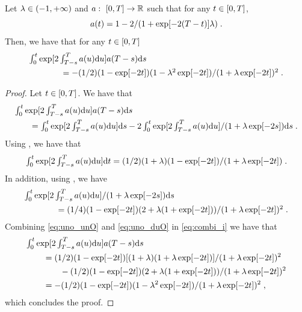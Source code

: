   \begin{lemma}
    \label{lemma:hola_pas_carre}
  Let $\lambda \in \left(-1, +\infty\right)$ and $a: \ \left[0,T\right] \to \mathbb{R}$ such
  that for any $t \in \left[0,T\right]$,
  \begin{equation}
    a(t) = 1 - 2/(1 + \exp[-2(T-t)]\lambda) \; . 
  \end{equation}
  Then, we have that for any $t \in \left[0,T\right]$
  \begin{align}
    &\textstyle{
      \int_0^t \exp[ 2\int_{T-s}^T a(u) \mathrm{d}u] a(T-s) \mathrm{d}s} \\
    & \qquad \qquad \textstyle{= -(1/2)(1- \exp[-2t])(1 - \lambda^2 \exp[-2t])/(1 + \lambda \exp[-2t])^2 \;. 
      }
  \end{align}
\end{lemma}

\begin{proof}
  Let $t \in \left[0,T\right]$. We have that
  \begin{align}
    &\textstyle{\int_0^t \exp[ 2\int_{T-s}^T a(u) \mathrm{d}u] a(T-s) \mathrm{d}s} \\
    & \qquad \textstyle{= \int_0^t \exp[ 2\int_{T-s}^T a(u) \mathrm{d}u] \mathrm{d}s - 2 \int_0^t  \exp[ 2\int_{T-s}^T a(u) \mathrm{d}u] / (1 + \lambda \exp[-2s]) \mathrm{d}s } \; . \label{eq:combi_i}
  \end{align}
  Using , we have that
  \begin{equation}
    \textstyle{
      \int_0^t \exp[ 2\int_{T-s}^T a(u) \mathrm{d}u] \mathrm{d}t = (1/2)(1+\lambda)(1 - \exp[-2t])/(1 + \lambda \exp[-2t])\;. 
    }
    \label{eq:uno_unO}
  \end{equation}
  In addition, using , we have 
  \begin{align}
    &\textstyle{
      \int_0^t  \exp[ 2\int_{T-s}^T a(u) \mathrm{d}u] / (1 + \lambda \exp[-2s]) \mathrm{d}s} \\
    & \qquad \qquad \textstyle{= (1/4)(1 - \exp[-2t])(2 + \lambda(1 + \exp[-2t]))/(1 + \lambda \exp[-2t])^2 \;. 
      } \label{eq:uno_duO}
  \end{align}
  Combining \eqref{eq:uno_unO} and \eqref{eq:uno_duO} in \eqref{eq:combi_i} we have that
  \begin{align}
    &\textstyle{\int_0^t \exp[ 2\int_{T-s}^T a(u) \mathrm{d}u] a(T-s) \mathrm{d}s} \\
    & \qquad = (1/2)(1 - \exp[-2t])[(1+\lambda)(1 + \lambda \exp[-2t])]/(1 + \lambda \exp[-2t])^2 \\
    & \qquad \qquad - (1/2)(1-\exp[-2t]) (2 + \lambda(1 + \exp[-2t]))/(1 + \lambda \exp[-2t])^2 \\
    & \qquad = -(1/2)(1- \exp[-2t])(1 - \lambda^2 \exp[-2t])/(1 + \lambda \exp[-2t])^2 \; ,
  \end{align}
  which concludes the proof.
\end{proof}

